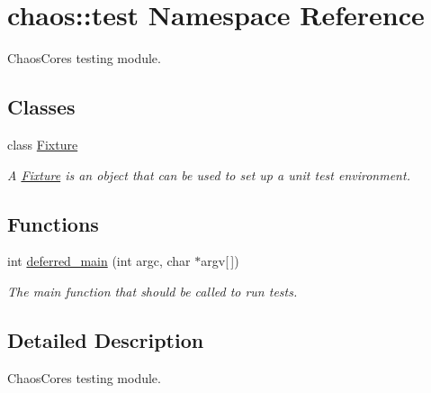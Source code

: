 \hypertarget{namespacechaos_1_1test}{}\section{chaos\+:\+:test Namespace Reference}
\label{namespacechaos_1_1test}


Chaos\+Core\textquotesingle{}s testing module.  


\subsection*{Classes}
\begin{DoxyCompactItemize}
\item 
class \hyperlink{classchaos_1_1test_1_1_fixture}{Fixture}
\begin{DoxyCompactList}\small\item\em A \hyperlink{classchaos_1_1test_1_1_fixture}{Fixture} is an object that can be used to set up a unit test environment. \end{DoxyCompactList}\end{DoxyCompactItemize}
\subsection*{Functions}
\begin{DoxyCompactItemize}
\item 
\hypertarget{namespacechaos_1_1test_a1ae4ccfac97ca99463a922d8353ab274}{}int \hyperlink{namespacechaos_1_1test_a1ae4ccfac97ca99463a922d8353ab274}{deferred\+\_\+main} (int argc, char $\ast$argv\mbox{[}$\,$\mbox{]})\label{namespacechaos_1_1test_a1ae4ccfac97ca99463a922d8353ab274}

\begin{DoxyCompactList}\small\item\em The main function that should be called to run tests. \end{DoxyCompactList}\end{DoxyCompactItemize}


\subsection{Detailed Description}
Chaos\+Core\textquotesingle{}s testing module. 